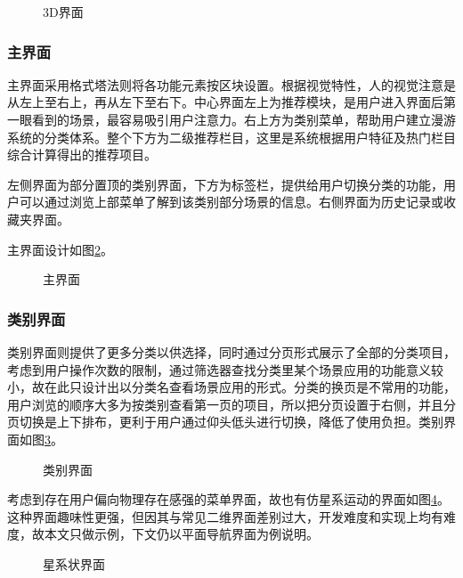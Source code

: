 \begin{figure}[htp]
\centering
{}
\caption{3D界面}
\label{fig:d-03}
\end{figure}

\subsubsection{主界面}
主界面采用格式塔法则将各功能元素按区块设置。根据视觉特性，人的视觉注意是从左上至右上，再从左下至右下。中心界面左上为推荐模块，是用户进入界面后第一眼看到的场景，最容易吸引用户注意力。右上方为类别菜单，帮助用户建立漫游系统的分类体系。整个下方为二级推荐栏目，这里是系统根据用户特征及热门栏目综合计算得出的推荐项目。

左侧界面为部分置顶的类别界面，下方为标签栏，提供给用户切换分类的功能，用户可以通过浏览上部菜单了解到该类别部分场景的信息。右侧界面为历史记录或收藏夹界面。

主界面设计如图\ref{fig:d-01}。

\begin{figure}[htp]
\centering
{}
\caption{主界面}
\label{fig:d-01}
\end{figure}

\subsubsection{类别界面}
类别界面则提供了更多分类以供选择，同时通过分页形式展示了全部的分类项目，考虑到用户操作次数的限制，通过筛选器查找分类里某个场景应用的功能意义较小，故在此只设计出以分类名查看场景应用的形式。分类的换页是不常用的功能，用户浏览的顺序大多为按类别查看第一页的项目，所以把分页设置于右侧，并且分页切换是上下排布，更利于用户通过仰头低头进行切换，降低了使用负担。类别界面如图\ref{fig:d-06}。

\begin{figure}[htp]
\centering
{}
\caption{类别界面}
\label{fig:d-06}
\end{figure}

考虑到存在用户偏向物理存在感强的菜单界面，故也有仿星系运动的界面如图\ref{fig:d-02}。这种界面趣味性更强，但因其与常见二维界面差别过大，开发难度和实现上均有难度，故本文只做示例，下文仍以平面导航界面为例说明。

\begin{figure}[htp]
\centering
{}
\caption{星系状界面}
\label{fig:d-02}
\end{figure}

